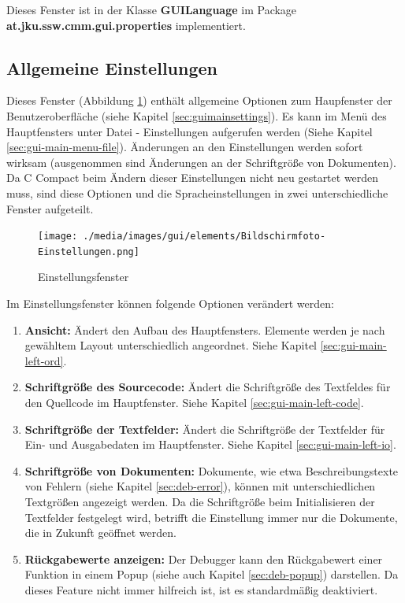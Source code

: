 Dieses Fenster ist in der Klasse \textbf{GUILanguage} im Package \textbf{at.jku.ssw.cmm.gui.properties} implementiert. 

\subsection{Allgemeine Einstellungen}
\label{sec:win-set}
Dieses Fenster (Abbildung \ref{fig:win-set}) enthält allgemeine Optionen zum Haupfenster der Benutzeroberfläche (siehe Kapitel \ref{sec:guimainsettings}). Es kann im Menü des Hauptfensters unter \glqq{}Datei\grqq{} - \glqq{}Einstellungen\grqq{} aufgerufen werden (Siehe Kapitel \ref{sec:gui-main-menu-file}). Änderungen an den Einstellungen werden sofort wirksam (ausgenommen sind Änderungen an der Schriftgröße von Dokumenten). Da C Compact beim Ändern dieser Einstellungen nicht neu gestartet werden muss, sind diese Optionen und die Spracheinstellungen in zwei unterschiedliche Fenster aufgeteilt.

\begin{figure}[htp]
\centering
\texttt{[image: ./media/images/gui/elements/Bildschirmfoto-Einstellungen.png]}
\caption{Einstellungsfenster}
\label{fig:win-set}
\end{figure}

Im Einstellungsfenster können folgende Optionen verändert werden:
\begin{enumerate}
\item \textbf{Ansicht:} Ändert den Aufbau des Hauptfensters. Elemente werden je nach gewähltem Layout unterschiedlich angeordnet. Siehe Kapitel \ref{sec:gui-main-left-ord}.
\item \textbf{Schriftgröße des Sourcecode:} Ändert die Schriftgröße des Textfeldes für den Quellcode im Hauptfenster. Siehe Kapitel \ref{sec:gui-main-left-code}.
\item \textbf{Schriftgröße der Textfelder:} Ändert die Schriftgröße der Textfelder für Ein- und Ausgabedaten im Hauptfenster. Siehe Kapitel \ref{sec:gui-main-left-io}.
\item \textbf{Schriftgröße von Dokumenten:} Dokumente, wie etwa Beschreibungstexte von Fehlern (siehe Kapitel \ref{sec:deb-error}), können mit unterschiedlichen Textgrößen angezeigt werden. Da die Schriftgröße beim Initialisieren der Textfelder festgelegt wird, betrifft die Einstellung immer nur die Dokumente, die in Zukunft geöffnet werden.
\item \textbf{Rückgabewerte anzeigen:} Der Debugger kann den Rückgabewert einer Funktion in einem Popup (siehe auch Kapitel \ref{sec:deb-popup}) darstellen. Da dieses Feature nicht immer hilfreich ist, ist es standardmäßig deaktiviert.
\end{enumerate}

